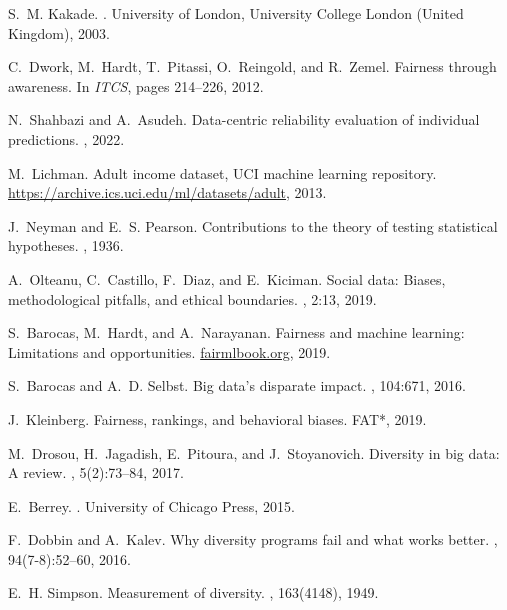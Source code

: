 \documentclass[11pt]{article}
\begin{document}
\begin{thebibliography}{10}
S.~M. Kakade.
.
\newblock University of London, University College London (United Kingdom), 2003.

C.~Dwork, M.~Hardt, T.~Pitassi, O.~Reingold, and R.~Zemel.
\newblock Fairness through awareness.
\newblock In {\em ITCS}, pages 214--226, 2012.

N.~Shahbazi and A.~Asudeh.
\newblock Data-centric reliability evaluation of individual predictions.
, 2022.

M.~Lichman.
\newblock Adult income dataset, {UCI} machine learning repository.
\newblock \url{https://archive.ics.uci.edu/ml/datasets/adult}, 2013.

J.~Neyman and E.~S. Pearson.
\newblock Contributions to the theory of testing statistical hypotheses.
, 1936.

A.~Olteanu, C.~Castillo, F.~Diaz, and E.~Kiciman.
\newblock Social data: Biases, methodological pitfalls, and ethical boundaries.
, 2:13, 2019.

S.~Barocas, M.~Hardt, and A.~Narayanan.
\newblock Fairness and machine learning: Limitations and opportunities.
\newblock \url{fairmlbook.org}, 2019.

S.~Barocas and A.~D. Selbst.
\newblock Big data's disparate impact.
, 104:671, 2016.

J.~Kleinberg.
\newblock Fairness, rankings, and behavioral biases.
\newblock FAT*, 2019.

M.~Drosou, H.~Jagadish, E.~Pitoura, and J.~Stoyanovich.
\newblock Diversity in big data: A review.
, 5(2):73--84, 2017.

E.~Berrey.
.
\newblock University of Chicago Press, 2015.

F.~Dobbin and A.~Kalev.
\newblock Why diversity programs fail and what works better.
, 94(7-8):52--60, 2016.

E.~H. Simpson.
\newblock Measurement of diversity.
, 163(4148), 1949.


\end{thebibliography}
\end{document}
